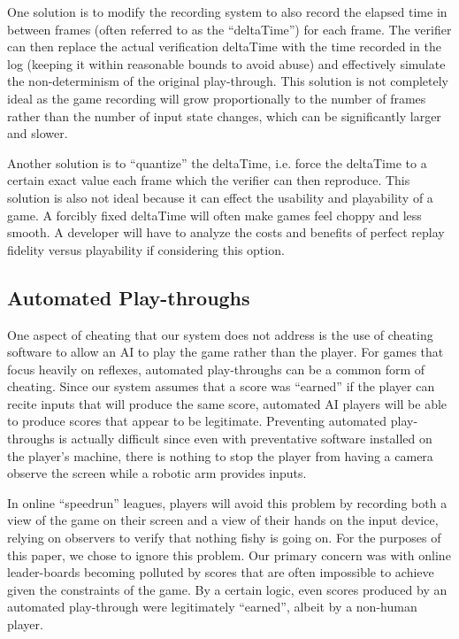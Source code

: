 \documentclass [11pt, twocolumn] {article}
\begin{document}
One solution is to modify the recording system to also record the elapsed time in between frames (often referred to as the ``deltaTime'')  for each frame. The verifier can then replace the actual verification deltaTime with the time recorded in the log (keeping it within reasonable bounds to avoid abuse) and effectively simulate the non-determinism of the original play-through. This solution is not completely ideal as the game recording will grow proportionally to the number of frames rather than the number of input state changes, which can be significantly larger and slower. 

Another solution is to ``quantize'' the deltaTime, i.e. force the deltaTime to a certain exact value each frame which the verifier can then reproduce. This solution is also not ideal because it can effect the usability and playability of a game. A forcibly fixed deltaTime will often make games feel choppy and less smooth. A developer will have to analyze the costs and benefits of perfect replay fidelity versus playability if considering this option. 

\subsection { Automated Play-throughs} 

One aspect of cheating that our system does not address is the use of cheating software to allow an AI to play the game rather than the player. For games that focus heavily on reflexes, automated play-throughs can be a common form of cheating. Since our system assumes that a score was ``earned'' if the player can recite inputs that will produce the same score, automated AI players will be able to produce scores that appear to be legitimate. Preventing automated play-throughs is actually difficult since even with preventative software installed on the player's machine, there is nothing to stop the player from having a camera observe the screen while a robotic arm provides inputs. 

In online ``speedrun'' leagues, players will avoid this problem by recording both a view of the game on their screen and a view of their hands on the input device, relying on observers to verify that nothing fishy is going on. For the purposes of this paper, we chose to ignore this problem. Our primary concern was with online leader-boards becoming polluted by scores that are often impossible to achieve given the constraints of the game. By a certain logic, even scores produced by an automated play-through were legitimately ``earned'', albeit by a non-human player. 
\end{document}
